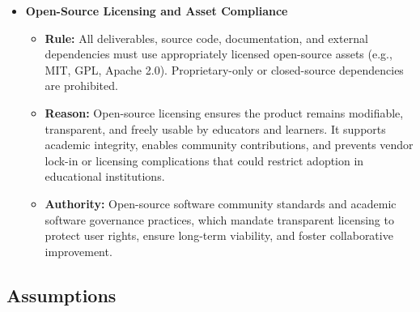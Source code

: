 \documentclass[12pt]{article}
\begin{document}
\begin{itemize}
    \item \textbf{Open-Source Licensing and Asset Compliance}
    \begin{itemize}
        \item \textbf{Rule:} All deliverables, source code, documentation, and external dependencies must use appropriately licensed open-source assets (e.g., MIT, GPL, Apache 2.0). Proprietary-only or closed-source dependencies are prohibited.
        \item \textbf{Reason:} Open-source licensing ensures the product remains modifiable, transparent, and freely usable by educators and learners. It supports academic integrity, enables community contributions, and prevents vendor lock-in or licensing complications that could restrict adoption in educational institutions.
        \item \textbf{Authority:} Open-source software community standards and academic software governance practices, which mandate transparent licensing to protect user rights, ensure long-term viability, and foster collaborative improvement.
    \end{itemize}
\end{itemize}

\subsection{Assumptions}
\end{document}
